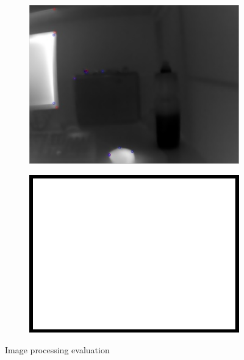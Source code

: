 \begin{figure}
\begin{subfigure}{0.49\columnwidth}
    \includegraphics[width=1.00\textwidth]{media/V_C_highsnrcornersnonlocal.jpg}
    	\caption{}
		\label{fig:imgprocessing_7}
  \end{subfigure}
	\begin{subfigure}{0.49\columnwidth}
    \centering
    \includegraphics[width=1.00\textwidth]{media/dummy.jpg}
		\caption{}
		\label{fig:imgprocessing_8}
  \end{subfigure}
\caption{Image processing evaluation}
\label{fig:imgprocessing}
\end{figure}

